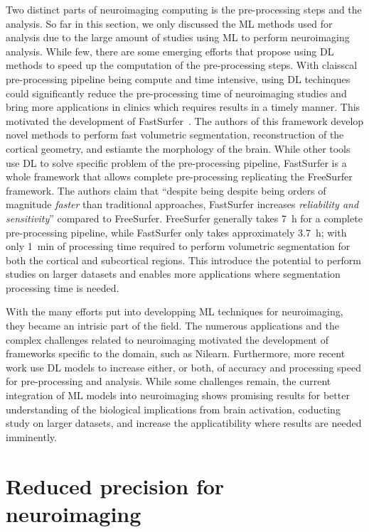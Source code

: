 Two distinct parts of neuroimaging computing is the pre-processing steps and the analysis.
So far in this section, we only discussed the ML methods used for analysis due to
the large amount of studies using ML to perform neuroimaging analysis.
While few, there are some emerging efforts that propose using DL methods to speed up
the computation of the pre-processing steps.
With claisscal pre-processing pipeline being compute and time intensive, using 
DL techinques could significantly reduce the pre-processing time of neuroimaging studies
and bring more applications in clinics which requires results in a timely manner.
This motivated the development of FastSurfer~\cite{Henschel2020-vq}.
The authors of this framework develop novel methods to perform fast volumetric segmentation,
reconstruction of the cortical geometry, and estiamte the morphology of the brain.
While other tools use DL to solve specific problem of the pre-processing pipeline,
FastSurfer is a whole framework that allows complete pre-processing replicating the 
FreeSurfer framework.
The authors claim that ``despite being despite being orders of magnitude \textit{faster} than
traditional approaches, FastSurfer increases \textit{reliability and sensitivity}'' compared to FreeSurfer.
FreeSurfer generally takes \SI{7}{\hour} for a complete pre-processing pipeline, while
FastSurfer only takes approximately \SI{3.7}{\hour}; with only \SI{1}{\minute} of
processing time required to perform volumetric segmentation for both the cortical and subcortical regions.
This introduce the potential to perform studies on larger datasets and enables more
applications where segmentation processing time is needed.

With the many efforts put into developping ML techniques for neuroimaging, they 
became an intrisic part of the field.
The numerous applications and the complex challenges related to neuroimaging 
motivated the development of frameworks specific to the domain, such as Nilearn.
Furthermore, more recent work use DL models to increase either, or both, of accuracy
and processing speed for pre-processing and analysis.
While some challenges remain, the current integration of ML models into neuroimaging
shows promising results for better understanding of the biological implications from 
brain activation, coducting study on larger datasets, and increase the 
applicatibility where results are needed imminently.

\section{Reduced precision for neuroimaging} %
